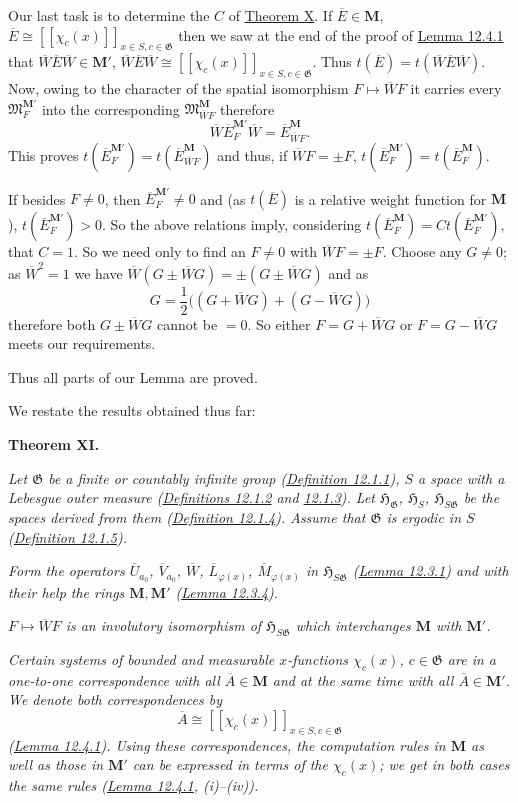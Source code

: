 \documentclass[12pt,b5paper,twoside]{article}
\newcommand{\Hspace}{\mathfrak H}
\newcommand{\M}{\mathbf M}
\newcommand{\MainTheorem}[1]{%
  \par\smallskip\noindent\phantomsection\label{thm:#1}\textbf{Theorem #1.}\enspace
}
\newcommand{\defref}[1]{\hyperref[def:#1]{Definition #1}}
\newcommand{\lemref}[1]{\hyperref[lem:#1]{Lemma #1}}
\newcommand{\thmref}[1]{\hyperref[thm:#1]{Theorem #1}}
\begin{document}
Our last task is to determine the $C$ of \thmref{X}. If
$\overline E\in\M$, $\overline E\cong
[[\chi_c(x)]]_{x\in S,c\in\mathfrak G}$ then we saw at the end of the proof
of \lemref{12.4.1} that $\overline W\overline E\overline W\in\M'$,
$\overline W\overline E\overline W\cong
[[\chi_c(x)]]_{x\in S,c\in\mathfrak G}$. Thus
$t(\overline E)=t(\overline W\overline E\overline W)$. Now, owing to the
character of the spatial isomorphism $F\mapsto\overline WF$ it carries every
$\mathfrak M_F^{\M'}$ into the corresponding $\mathfrak M_{\overline WF}^{\M}$
therefore
\[
 \overline W\overline E_F^{\M'}\overline W
 =\overline E_{\overline WF}^{\M}.
\]
This proves $t(\overline E_F^{\M'})=t(\overline E_{\overline WF}^{\M})$
and thus, if $\overline WF=\pm F$,
$t(\overline E_F^{\M'})=t(\overline E_F^{\M})$.

If besides $F\neq0$, then $\overline E_F^{\M'}\neq0$ and (as
$t(\overline E)$ is a relative weight function for $\M$),
$t(\overline E_F^{\M'})>0$. So the above relations imply, considering
$t(\overline E_F^{\M})=Ct(\overline E_F^{\M'})$, that $C=1$. So we need only
to find an $F\neq0$ with $\overline WF=\pm F$. Choose any $G\neq0$; as
$\overline W^2=1$ we have
$\overline W(G\pm\overline WG)=\pm(G\pm\overline WG)$ and as
\[
 G=\frac12\bigl((G+\overline WG)+(G-\overline WG)\bigr)
\]
therefore both $G\pm\overline WG$ cannot be $=0$. So either
$F=G+\overline WG$ or $F=G-\overline WG$ meets our requirements.

Thus all parts of our Lemma are proved.

We restate the results obtained thus far:

\MainTheorem{XI}
\emph{Let $\mathfrak G$ be a finite or countably infinite group
(\defref{12.1.1}), $S$ a space with a Lebesgue outer measure
(\hyperref[def:12.1.2]{Definitions 12.1.2} and
\hyperref[def:12.1.3]{12.1.3}). Let
$\Hspace_{\mathfrak G}$, $\Hspace_S$, $\Hspace_{S\mathfrak G}$ be the spaces
derived from them (\defref{12.1.4}). Assume that $\mathfrak G$ is ergodic in
$S$ (\defref{12.1.5}).}

\emph{Form the operators $\overline U_{a_0}$, $\overline V_{a_0}$,
$\overline W$, $\overline L_{\varphi(x)}$, $\overline M_{\varphi(x)}$ in
$\Hspace_{S\mathfrak G}$ (\lemref{12.3.1}) and with their help the rings
$\M,\M'$ (\lemref{12.3.4}).}

\emph{$F\mapsto\overline WF$ is an involutory isomorphism of
$\Hspace_{S\mathfrak G}$ which interchanges $\M$ with $\M'$.}

\emph{Certain systems of bounded and measurable $x$-functions $\chi_c(x)$,
$c\in\mathfrak G$ are in a one-to-one correspondence with all
$\overline A\in\M$ and at the same time with all $\overline A\in\M'$. We
denote both correspondences by}
\[
 \overline A\cong[[\chi_c(x)]]_{x\in S,c\in\mathfrak G}
\]
\emph{(\lemref{12.4.1}). Using these correspondences, the computation rules in
$\M$ as well as those in $\M'$ can be expressed in terms of the $\chi_c(x)$;
we get in both cases the same rules (\lemref{12.4.1}, (i)--(iv)).}
\end{document}
